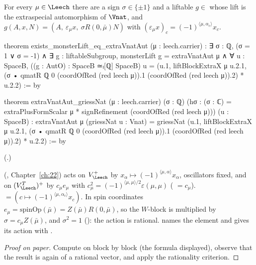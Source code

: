 \begin{theorem}\label{ch21:thm:extra}
For every $\mu\in\Leech$ there are a sign $\sigma\in\{\pm1\}$ and a liftable $g\in$  whose lift is
the extraspecial automorphism  of $\Vnat$, and $g(A,x,N)=(A,\ \varepsilon_\mu x,\ \sigma R(0,\bar\mu)N)$
with $(\varepsilon_\mu x)_c=(-1)^{\langle\mu,\alpha_c\rangle}x_c$.
\end{theorem}
\begin{leancode}
theorem exists_monsterLift_eq_extraVnatAut (μ : leech.carrier) :
    ∃ σ : ℚ, (σ = 1 ∨ σ = -1) ∧ ∃ g : liftableSubgroup, monsterLift g = extraVnatAut μ ∧
      ∀ u : SpaceB, ((g : AutO) : SpaceB ≃ₗ[ℚ] SpaceB) u
        = (u.1, liftBlockExtraX μ u.2.1,
            (σ • qmatR ℚ 0 (coordOfRed (red leech μ)).1 (coordOfRed (red leech μ)).2) * u.2.2) := by
\end{leancode}
\begin{leancode}
theorem extraVnatAut_griessNat (μ : leech.carrier) (σ : ℚ)
    (hσ : (σ : ℂ) = extraPlusFormScalar μ * signRefinement (coordOfRed (red leech μ)))
    (u : SpaceB) :
    extraVnatAut μ (griessNat u : Vnat)
      = griessNat (u.1, liftBlockExtraX μ u.2.1,
          (σ • qmatR ℚ 0 (coordOfRed (red leech μ)).1 (coordOfRed (red leech μ)).2) * u.2.2) := by
\end{leancode}
(.)
\begin{dictionary}
 (, Chapter~\ref{ch:22}) acts on $V_\Leech^+$
by $x_\alpha\mapsto(-1)^{\langle\mu,\alpha\rangle}x_\alpha$, oscillators fixed, and on $(V_\Leech^T)^+$ by
$c_\mu e_\mu$ with $c_\mu^2=(-1)^{\langle\mu,\mu\rangle/2}\varepsilon(\mu,\mu)$
( $=c_\mu$).   $=(c\mapsto(-1)^{\langle\mu,\alpha_c\rangle}x_c)$.
In spin coordinates $e_\mu=\mathrm{spinOp}(\bar\mu)=Z(\bar\mu)R(0,\bar\mu)$, so the $W$-block is multiplied
by $\sigma=c_\mu Z(\bar\mu)$, and $\sigma^2=1$ (): the action is rational.
 names the element and  gives its action with
.
\end{dictionary}
\begin{proof}[Proof on paper]
Compute  on  block by block (the formula displayed), observe that the
result is again  of a rational vector, and apply the rationality criterion.
\end{proof}
